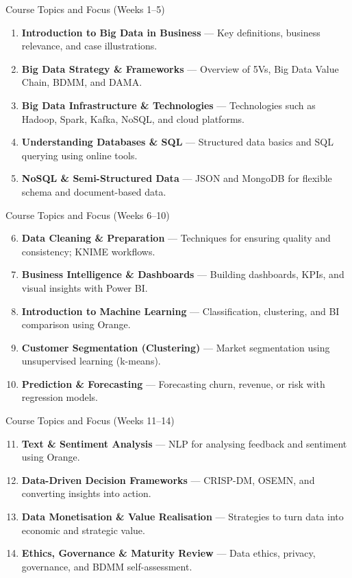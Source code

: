 \documentclass[aspectratio=169, table]{beamer}
\begin{document}
\begin{frame}[fragile]{Course Topics and Focus (Weeks 1–5)}
	\vspace{20pt}
	\small
	\begin{enumerate}
		\item \textbf{Introduction to Big Data in Business} — Key definitions, business relevance, and case illustrations.
		\item \textbf{Big Data Strategy \& Frameworks} — Overview of 5Vs, Big Data Value Chain, BDMM, and DAMA.
		\item \textbf{Big Data Infrastructure \& Technologies} — Technologies such as Hadoop, Spark, Kafka, NoSQL, and cloud platforms.
		\item \textbf{Understanding Databases \& SQL} — Structured data basics and SQL querying using online tools.
		\item \textbf{NoSQL \& Semi-Structured Data} — JSON and MongoDB for flexible schema and document-based data.
	\end{enumerate}
\end{frame}

\begin{frame}[fragile]{Course Topics and Focus (Weeks 6–10)}
	\vspace{20pt}
	\small
	\begin{enumerate}
		\setcounter{enumi}{5}
		\item \textbf{Data Cleaning \& Preparation} — Techniques for ensuring quality and consistency; KNIME workflows.
		\item \textbf{Business Intelligence \& Dashboards} — Building dashboards, KPIs, and visual insights with Power BI.
		\item \textbf{Introduction to Machine Learning} — Classification, clustering, and BI comparison using Orange.
		\item \textbf{Customer Segmentation (Clustering)} — Market segmentation using unsupervised learning (k-means).
		\item \textbf{Prediction \& Forecasting} — Forecasting churn, revenue, or risk with regression models.
	\end{enumerate}
\end{frame}

\begin{frame}[fragile]{Course Topics and Focus (Weeks 11–14)}
	\vspace{20pt}
	\small
	\begin{enumerate}
		\setcounter{enumi}{10}
		\item \textbf{Text \& Sentiment Analysis} — NLP for analysing feedback and sentiment using Orange.
		\item \textbf{Data-Driven Decision Frameworks} — CRISP-DM, OSEMN, and converting insights into action.
		\item \textbf{Data Monetisation \& Value Realisation} — Strategies to turn data into economic and strategic value.
		\item \textbf{Ethics, Governance \& Maturity Review} — Data ethics, privacy, governance, and BDMM self-assessment.
	\end{enumerate}
\end{frame}
\end{document}
